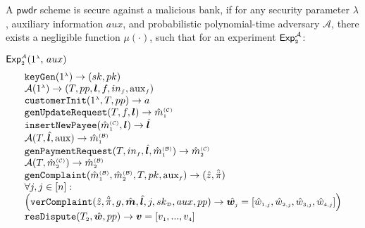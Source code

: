 \begin{definition}\label{def::Security-against-malicious-bank} A $\mathsf{pwdr}$ scheme is secure against a malicious bank, if for any security parameter $\lambda$, auxiliary information $ {aux}$, and   probabilistic polynomial-time adversary $\mathcal{A}$, there exists a negligible function $\mu(\cdot)$, such that for an experiment $\mathsf{Exp}_{\scriptscriptstyle 2}^{\mathcal{A}}$:


\begin{center}
\begin{mybox}[colback=white,  width=98mm, height=62mm, drop fuzzy shadow southwest]{$\mathsf{Exp}_{\scriptscriptstyle 2}^{\scriptscriptstyle\mathcal{A}}(1^{\scriptscriptstyle\lambda}\text{, }  {aux})$}
$$
  \begin{array}{l}
%
 \mathtt{keyGen}(1^{\st\lambda})\rightarrow (sk,pk)\\
%
\mathcal{A}(1^{\st \lambda})\rightarrow (T, pp, \bm{l}, f,  in_{\st f}, \text{aux}_{\st f})\\
%
\mathtt{customerInit} (1^{\st \lambda}, T, pp)\rightarrow a\\
%
\mathtt{genUpdateRequest}(T, f, {\bm l})\rightarrow \hat m^{\st\mathcal{(C)}}_{\st 1}\\
%
\mathtt{insertNewPayee}(\hat{m}^{\st\mathcal{(C)}}_{\st 1}, {\bm l})\rightarrow  \hat{\bm l}\\
%
\mathcal{A}(T, \hat{\bm l}, \text{aux})\rightarrow \hat m^{\st\mathcal{(B)}}_{\st1}\\
%
\mathtt{genPaymentRequest}(T, in_{\st f}, \hat{\bm{l}}, \hat m^{\st\mathcal{(B)}}_{\st1})\rightarrow \hat m^{\st\mathcal{(C)}}_{\st2}\\
%
\mathcal{A}(T, \hat m^{\st\mathcal{(C)}}_{\st2})\rightarrow \hat m^{\st\mathcal{(B)}}_{\st2}\\
%
\mathtt{genComplaint}(\hat m^{\st\mathcal{(B)}}_{\st 1}, \hat m^{\st\mathcal{(B)}}_{\st2}, T, pk, \text{aux}_{\st f})\rightarrow (\hat z, \hat{\ddot \pi})\\
%
 \forall j, j\in [n]:\\
\Big(\mathtt{verComplaint}( \hat z, \hat{\ddot{\pi}}, g, \hat{\bm m}, \hat{\bm{l}}, j, sk_{\st\mathcal D}, aux, pp)\rightarrow \hat{\bm{w}_{\st j}}= [\hat {w}_{\st 1,j}, \hat{w}_{\st 2, j}, \hat{w}_{\st 3, j}, \hat{w}_{\st 4, j}]
\Big)
\\
%
\mathtt{resDispute}(T_{\st 2}, \hat {\bm w}, pp)\rightarrow \bm v=[v_{\st 1},...,   v_{\st 4}]\\
   \end{array} 
$$
\end{mybox}
\end{center}


\end{definition}
